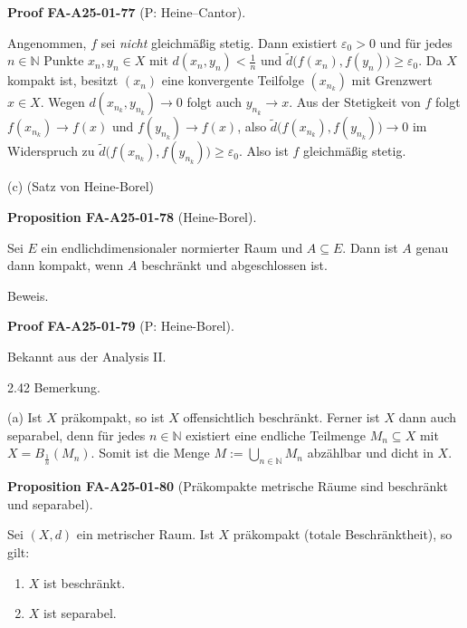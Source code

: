 \documentclass[10pt, letterpaper]{article}
\newcommand{\CustomHeading}[3]{%
  \par\medskip\noindent%
  \textbf{#1 #2} \textnormal{(#3)}.\enskip%
}
\newenvironment{PROP}[2]{\begin{unitbox}\CustomHeading{Proposition}{#1}{#2}}{\end{unitbox}}
\newenvironment{PROOF}[2]{\begin{unitbox}\CustomHeading{Proof}{#1}{#2}}{\end{unitbox}}
\begin{document}
\begin{PROOF}{FA-A25-01-77}{P: Heine--Cantor}
Angenommen, $f$ sei \emph{nicht} gleichmäßig stetig. Dann existiert $\varepsilon_0>0$
und für jedes $n\in\mathbb N$ Punkte $x_n,y_n\in X$ mit
$d(x_n,y_n)<\tfrac1n$ und $\tilde d\bigl(f(x_n),f(y_n)\bigr)\ge\varepsilon_0$.
Da $X$ kompakt ist, besitzt $(x_n)$ eine konvergente Teilfolge $(x_{n_k})$
mit Grenzwert $x\in X$. Wegen $d(x_{n_k},y_{n_k})\to0$ folgt auch $y_{n_k}\to x$.
Aus der Stetigkeit von $f$ folgt $f(x_{n_k})\to f(x)$ und $f(y_{n_k})\to f(x)$,
also $\tilde d\bigl(f(x_{n_k}),f(y_{n_k})\bigr)\to0$ im Widerspruch zu
$\tilde d\bigl(f(x_{n_k}),f(y_{n_k})\bigr)\ge \varepsilon_0$. Also ist $f$
gleichmäßig stetig.
\end{PROOF}


(c) (Satz von Heine-Borel) 


\begin{PROP}{FA-A25-01-78}{Heine-Borel}
Sei $E$ ein endlichdimensionaler normierter Raum und $A \subseteq E$. Dann ist $A$ genau dann kompakt, wenn $A$ beschränkt und abgeschlossen ist.
\end{PROP}

Beweis. 


\begin{PROOF}{FA-A25-01-79}{P: Heine-Borel}
Bekannt aus der Analysis II.
\end{PROOF}




2.42 Bemerkung.

(a) Ist $X$ präkompakt, so ist $X$ offensichtlich beschränkt. Ferner ist $X$ dann auch separabel, denn für jedes $n \in \mathbb{N}$ existiert eine endliche Teilmenge $M_{n} \subseteq X$ mit $X=B_{\frac{1}{n}}\left(M_{n}\right)$. Somit ist die Menge $M:=\bigcup_{n \in \mathbb{N}} M_{n}$ abzählbar und dicht in $X$.\\


\begin{PROP}{FA-A25-01-80}{Präkompakte metrische Räume sind beschränkt und separabel}
Sei $(X,d)$ ein metrischer Raum. Ist $X$ präkompakt (totale Beschränktheit), so gilt:
\begin{enumerate}
\item[(i)] $X$ ist beschränkt.
\item[(ii)] $X$ ist separabel.
\end{enumerate}
\end{PROP}
\end{document}
